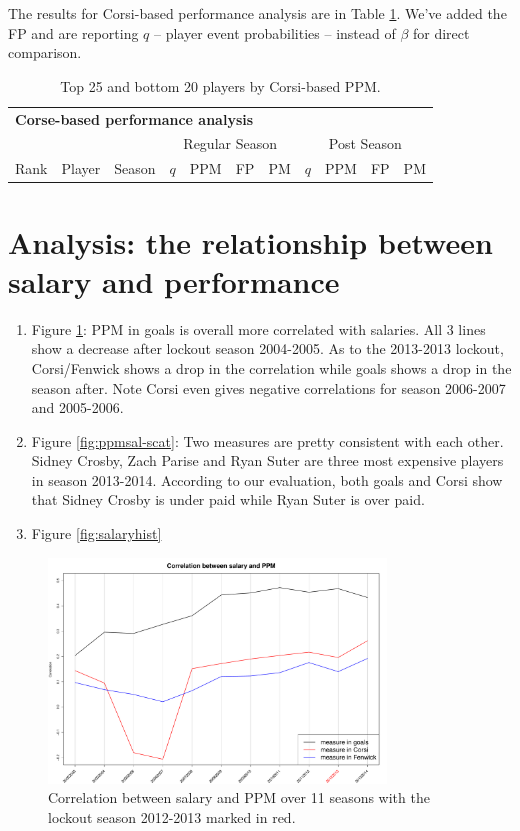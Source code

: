 The results for Corsi-based performance analysis are in Table \ref{tab:corsi}.
We've added the FP and are reporting $q$ -- player event probabilities --
instead of $\beta$ for direct comparison.


\begin{table}[p]
        \centering\small
        \begin{tabular}{r c c r r r r r r r r }
        \multicolumn{11}{l}{\bf Corse-based performance analysis}\\
            & & & \multicolumn{4}{|c}{Regular Season} & \multicolumn{4}{|c}{Post Season}\\
            Rank & Player & Season  & \multicolumn{1}{|c}{$q$} & PPM & FP & PM & \multicolumn{1}{|c}{$q$} & PPM & FP & PM  \\ \hline
\end{tabular}
\caption{\label{tab:corsi} Top 25 and bottom 20 players by Corsi-based PPM.}
\end{table}

\section{Analysis: the relationship between salary and performance}
\label{sec:salary}


\begin{enumerate}
    \item Figure \ref{fig:ppmsal-corr-season}: PPM in goals is overall more correlated with salaries. All 3 lines show a decrease after lockout season 2004-2005. As to the 2013-2013 lockout, Corsi/Fenwick shows a drop in the correlation while goals shows a drop in the season after. Note Corsi even gives negative correlations for season 2006-2007 and 2005-2006. 
    \item Figure \ref{fig:ppmsal-scat}: Two measures are pretty consistent with each other. Sidney Crosby, Zach Parise and Ryan Suter are three most expensive players in season 2013-2014. According to our evaluation, both goals and Corsi show that Sidney Crosby is under paid while Ryan Suter is over paid. 
    \item Figure \ref{fig:salaryhist}
\end{enumerate}

\begin{figure}[htb!]
    \centering
    \includegraphics[width=0.8\textwidth]{figures/ppmsal-corr-season.pdf}
    \caption{Correlation between salary and PPM over 11 seasons with the lockout season 2012-2013 marked in red.}\label{fig:ppmsal-corr-season}
\end{figure}

